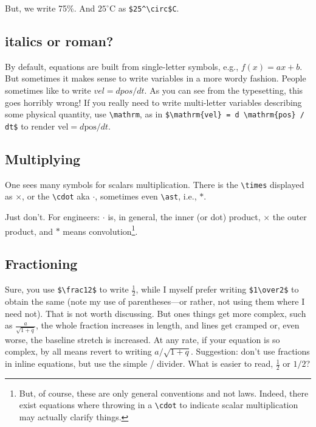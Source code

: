 \documentclass{article}
\begin{document}
But, we write 75\%. And $25^\circ$C as \verb+$25^\circ$C+.


\subsection{italics or roman?}
By default, equations are built from single-letter symbols, e.g., $f(x) = ax+b$.  But sometimes it makes
sense to write variables in a more wordy fashion.  People sometimes like to write $vel = d pos / d t$.  As
you can see from the typesetting, this goes horribly wrong!  If you really need to write multi-letter
variables describing some physical quantity, use \verb+\mathrm+, as in
\verb+$\mathrm{vel} = d \mathrm{pos} / dt$+ to render $\mathrm{vel} = d \mathrm{pos} / dt$.

\subsection{Multiplying}
One sees many symbols for scalars multiplication.  There is the \verb+\times+ displayed as $\times$,
or the \verb+\cdot+ aka $\cdot$, sometimes even \verb+\ast+, i.e., $\ast$.

Just don't.  For engineers: $\cdot$ is, in general, the inner (or dot) product, $\times$ the 
outer product, and $\ast$ means convolution\footnote{But, of course, these are only
general conventions and not laws.  Indeed, there exist equations where throwing in
a \verb+\cdot+ to indicate scalar multiplication may actually clarify things.}.


\subsection{Fractioning}
Sure, you use \verb+$\frac12$+ to write $\frac12$, while I myself prefer writing \verb+$1\over2$+ to obtain
the same (note my use of parentheses---or rather, not using them where I need not).
That is not worth discussing.  But ones things get more complex, such as $\frac a{\sqrt{1+q}}$, the whole
fraction increases in length, and lines get cramped or, even worse, the baseline stretch is increased.
At any rate, if your equation is so complex, by all means revert to writing $a/{\sqrt{1+q}}$.   Suggestion:
don't use fractions in inline equations, but use the simple / divider.  What is easier
to read, $\frac12$ or $1/2$?
\end{document}
